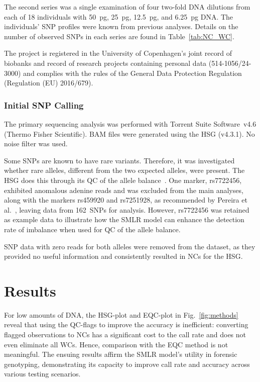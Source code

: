 \documentclass[preprint,5p,times,11pt]{elsarticle}
\begin{document}
The second series was a single examination of four two-fold DNA dilutions from each of 18 individuals with \SI{50}{\pg}, \SI{25}{\pg}, \SI{12.5}{\pg}, and \SI{6.25}{\pg} DNA.
The individuals' SNP profiles were known from previous analyses.
Details on the number of observed SNPs in each series are found in Table~\ref{tab:NC_WC}.

The project is registered in the University of Copenhagen’s joint record of biobanks and record of research projects containing personal data (514-1056/24-3000) and complies with the rules of the General Data Protection Regulation (Regulation (EU) 2016/679).


\subsubsection{Initial SNP Calling}
The primary sequencing analysis was performed with Torrent Suite Software~v4.6 (Thermo Fisher Scientific).
BAM files were generated using the HSG (v4.3.1).
No noise filter was used.

Some SNPs are known to have rare variants.
Therefore, it was investigated whether rare alleles, different from the two expected alleles, were present.
The HSG does this through its QC of the allele balance~\cite[p.~35]{hid}.
One marker, rs7722456, exhibited anomalous adenine reads and was excluded from the main analyses, along with the markers rs459920 and rs7251928, as recommended by Pereira et al.~\cite{pereira}, leaving data from 162~SNPs for analysis.
However, rs7722456 was retained as example data to illustrate how the SMLR model can enhance the detection rate of imbalance when used for QC of the allele balance.

SNP data with zero reads for both alleles were removed from the dataset, as they provided no useful information and consistently resulted in NCs for the HSG.



\section{Results}
For low amounts of DNA, the HSG-plot and EQC-plot in Fig.~\ref{fig:methods} reveal that using the QC-flags to improve the accuracy is inefficient:
converting flagged observations to NCs has a significant cost to the call rate and does not even eliminate all WCs.
Hence, comparison with the EQC method is not meaningful.
The ensuing results affirm the SMLR model's utility in forensic genotyping, demonstrating its capacity to improve call rate and accuracy across various testing scenarios.
\end{document}
